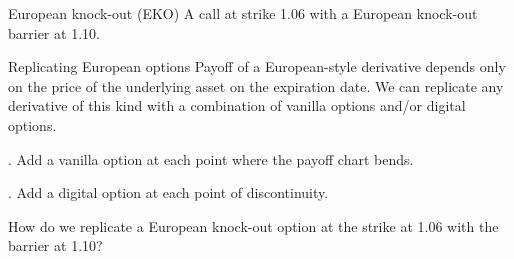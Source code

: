 \documentclass{beamer}
\begin{document}
\begin{frame}{European knock-out (EKO)}
\justify
A call at strike 1.06 with a European knock-out barrier at 1.10.
\centering
\end{frame}



\begin{frame}{Replicating European options}
\justify
Payoff of a European-style derivative depends only on the price of the underlying asset on the expiration date. We can replicate any derivative of this kind with a combination of vanilla options and/or digital options.

. Add a vanilla option at each point where the payoff chart bends.

. Add a digital option at each point of discontinuity.

\justify
How do we replicate a European knock-out option at the strike at 1.06 with the barrier at 1.10?
\end{frame}
\end{document}
